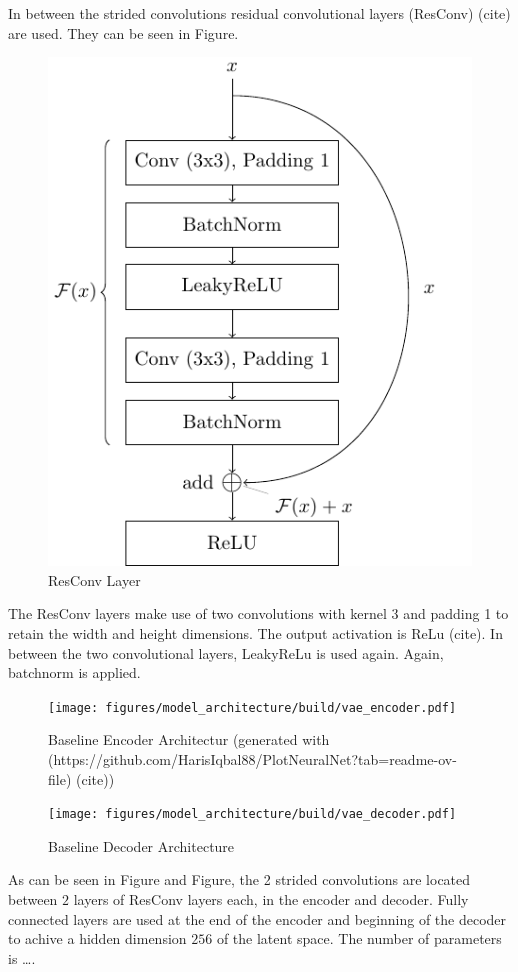 In between the strided convolutions residual convolutional layers (ResConv) (cite) are used.
They can be seen in Figure.
\begin{figure}[h!]
    \centering
    \includegraphics[]{figures/model_architecture/build/residual_conv_layer.pdf}
    \caption{ResConv Layer}
\end{figure}
The ResConv layers make use of two convolutions with kernel 3 and padding 1 to retain the width and height dimensions.
The output activation is ReLu (cite).
In between the two convolutional layers, LeakyReLu is used again.
Again, batchnorm is applied.
\begin{figure}[h!]
    \centering
    \texttt{[image: figures/model\_architecture/build/vae\_encoder.pdf]}
    \caption{Baseline Encoder Architectur (generated with (https://github.com/HarisIqbal88/PlotNeuralNet?tab=readme-ov-file) (cite))}
\end{figure}
\begin{figure}[h!]
    \centering
    \texttt{[image: figures/model\_architecture/build/vae\_decoder.pdf]}
    \caption{Baseline Decoder Architecture}
\end{figure}
As can be seen in Figure and Figure, the 2 strided convolutions are located between $2$ layers of ResConv layers each, in the encoder and decoder.
Fully connected layers are used at the end of the encoder and beginning of the decoder to achive a hidden dimension $256$ of the latent space. 
The number of parameters is \dots.


